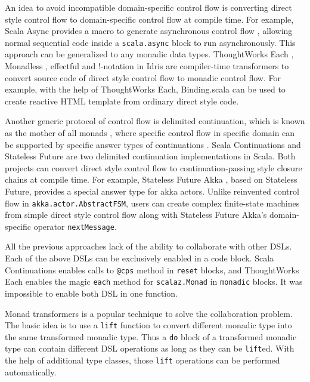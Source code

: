 An idea to avoid incompatible domain-specific control flow is converting direct style control flow to domain-specific control flow at compile time. For example, Scala Async provides a macro to generate asynchronous control flow \cite{haller2013sip}, allowing normal sequential code inside a \lstinline{scala.async} block to run asynchronously. This approach can be generalized to any monadic data types. ThoughtWorks Each \cite{yangbo2015each}, Monadless \cite{flavio2017monadless}, effectful \cite{crockett2013effectful} and !-notation in Idris \cite{brady2013idris} are compiler-time transformers to convert source code of direct style control flow to monadic control flow. For example, with the help of ThoughtWorks Each, Binding.scala\cite{yangbo2016binding} can be used to create reactive HTML template from ordinary direct style code.

Another generic protocol of control flow is delimited continuation, which is known as the mother of all monads \cite{piponi2008mother}, where specific control flow in specific domain can be supported by specific answer types of continuations \cite{asai2007polymorphic}. Scala Continuations \cite{rompf2009implementing} and Stateless Future \cite{yangbo2014stateless} are two delimited continuation implementations in Scala. Both projects can convert direct style control flow to continuation-passing style closure chains at compile time. For example, Stateless Future Akka \cite{yangbo2014statelessfutureakka}, based on Stateless Future, provides a special answer type for akka actors. Unlike reinvented control flow in \lstinline{akka.actor.AbstractFSM}, users can create complex finite-state machines from simple direct style control flow along with Stateless Future Akka's domain-specific operator \lstinline{nextMessage}.

All the previous approaches lack of the ability to collaborate with other DSLs. Each of the above DSLs can be exclusively enabled in a code block. Scala Continuations enables calls to \lstinline{@cps} method in \lstinline{reset} blocks, and ThoughtWorks Each enables the magic \lstinline{each} method \cite{yangbo2015each} for \lstinline{scalaz.Monad} in \lstinline{monadic} blocks. It was impossible to enable both DSL in one function.

Monad transformers \cite{liang1995monad} is a popular technique to solve the collaboration problem. The basic idea is to use a \lstinline{lift} function to convert different monadic type into the same transformed monadic type. Thus a \lstinline{do} block of a transformed monadic type can contain different DSL operations as long as they can be \lstinline{lift}ed. With the help of additional type classes, those \lstinline{lift} operations can be performed automatically.

